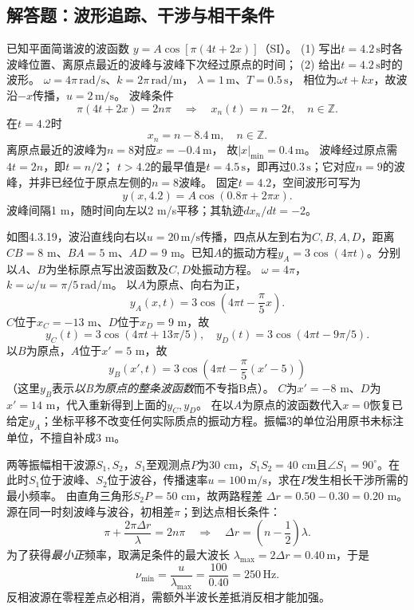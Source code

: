 \subsection{解答题：波形追踪、干涉与相干条件}

\problemtext 已知平面简谐波的波函数
$y=A\cos[\pi(4t+2x)]$（SI）。
(1) 写出$t=4.2\,\mathrm s$时各波峰位置、离原点最近的波峰与波峰下次经过原点的时间；
(2) 给出$t=4.2\,\mathrm s$时的波形。
\workings
$\omega=4\pi\,\mathrm{rad/s}$、$k=2\pi\,\mathrm{rad/m}$，
$\lambda=1\,\mathrm m$、$T=0.5\,\mathrm s$，
相位为$\omega t+kx$，故波沿$-x$传播，$u=2\,\mathrm{m/s}$。
波峰条件
\[
\pi(4t+2x)=2n\pi
\quad\Longrightarrow\quad
x_n(t)=n-2t,\quad n\in\mathbb Z.
\]
在$t=4.2$时
\[
\boxed{x_n=n-8.4\ \mathrm m,\quad n\in\mathbb Z}.
\]
离原点最近的波峰为$n=8$对应$x=-0.4\,\mathrm m$，
故$\boxed{|x|_{\min}=0.4\,\mathrm m}$。
波峰经过原点需$4t=2n$，即$t=n/2$；
$t>4.2$的最早值是$\boxed{t=4.5\,\mathrm s}$，即再过$0.3\,\mathrm s$；它对应$n=9$的波峰，并非已经位于原点左侧的$n=8$波峰。
固定$t=4.2$，空间波形可写为
\[
\boxed{y(x,4.2)=A\cos(0.8\pi+2\pi x)}.
\]
\crosscheck 波峰间隔1 m，随时间向左以2 m/s平移；其轨迹$dx_n/dt=-2$。

\problemtext 如图4.3.19，波沿直线向右以$u=20\,\mathrm{m/s}$传播，四点从左到右为$C,B,A,D$，距离$CB=8$ m、$BA=5$ m、$AD=9$ m。已知$A$的振动方程$y_A=3\cos(4\pi t)$。分别以$A$、$B$为坐标原点写出波函数及$C,D$处振动方程。
\workings
$\omega=4\pi$，$k=\omega/u=\pi/5\,\mathrm{rad/m}$。
以$A$为原点、向右为正，
\[
\boxed{y_A(x,t)=3\cos\left(4\pi t-\frac\pi5x\right)}.
\]
$C$位于$x_C=-13$ m、$D$位于$x_D=9$ m，故
\[
\boxed{y_C(t)=3\cos(4\pi t+13\pi/5)},\quad
\boxed{y_D(t)=3\cos(4\pi t-9\pi/5)}.
\]
以$B$为原点，$A$位于$x'=5$ m，故
\[
\boxed{y_B(x',t)=3\cos\left(4\pi t-\frac\pi5(x'-5)\right)}
\]
（这里$y_B$表示\emph{以B为原点的整条波函数}而不专指B点）。
$C$为$x'=-8$ m、$D$为$x'=14$ m，代入重新得到上面的$y_C,y_D$。
\crosscheck 在以$A$为原点的波函数代入$x=0$恢复已给定$y_A$；坐标平移不改变任何实际质点的振动方程。振幅3的单位沿用原书未标注单位，不擅自补成3 m。

\problemtext 两等振幅相干波源$S_1,S_2$，$S_1$至观测点$P$为$30$ cm，$S_1S_2=40$ cm且$\angle S_1=90^\circ$。在此时$S_1$位于波峰、$S_2$位于波谷，传播速率$u=100\,\mathrm{m/s}$，求在$P$发生相长干涉所需的最小频率。
\workings
由直角三角形$S_2P=50$ cm，故两路程差
$\Delta r=0.50-0.30=0.20$ m。
源在同一时刻波峰与波谷，初相差$\pi$；到达点相长条件：
\[
\pi+\frac{2\pi\Delta r}{\lambda}=2n\pi
\quad\Longrightarrow\quad
\Delta r=\left(n-\frac12\right)\lambda.
\]
为了获得\emph{最小正}频率，取满足条件的最大波长
$\lambda_{\max}=2\Delta r=0.40\,\mathrm m$，于是
\[
\boxed{\nu_{\min}=\frac{u}{\lambda_{\max}}
=\frac{100}{0.40}=250\,\mathrm{Hz}}.
\]
\crosscheck 反相波源在零程差点必相消，需额外半波长差抵消反相才能加强。

